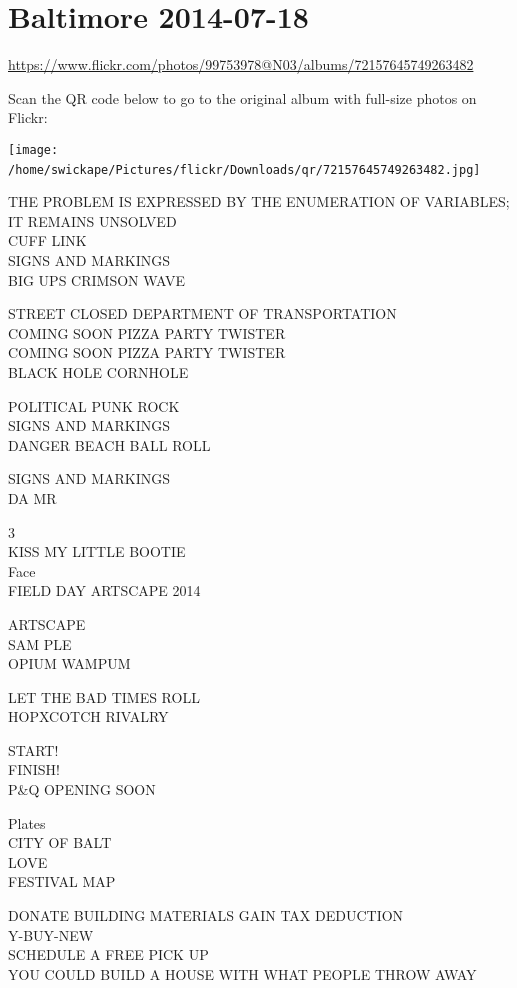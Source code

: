 \documentclass[10pt,letterpaper]{article}
\begin{document}
\section*{Baltimore 2014-07-18}

\url{https://www.flickr.com/photos/99753978@N03/albums/72157645749263482}

Scan the QR code below to go to the original album with full-size photos on Flickr:

\texttt{[image: /home/swickape/Pictures/flickr/Downloads/qr/72157645749263482.jpg]}
\

THE PROBLEM IS EXPRESSED BY THE ENUMERATION OF VARIABLES; IT REMAINS UNSOLVED\\
CUFF LINK\\
SIGNS AND MARKINGS\\
BIG UPS CRIMSON WAVE

STREET CLOSED DEPARTMENT OF TRANSPORTATION\\
COMING SOON PIZZA PARTY TWISTER\\
COMING SOON PIZZA PARTY TWISTER\\
BLACK HOLE CORNHOLE

POLITICAL PUNK ROCK\\
SIGNS AND MARKINGS\\
DANGER BEACH BALL ROLL

SIGNS AND MARKINGS\\
DA MR

3\\
KISS MY LITTLE BOOTIE\\
Face\\
FIELD DAY ARTSCAPE 2014

ARTSCAPE\\
SAM PLE\\
OPIUM WAMPUM

LET THE BAD TIMES ROLL\\
HOPXCOTCH RIVALRY

START!\\
FINISH!\\
P\&Q OPENING SOON

Plates\\
CITY OF BALT\\
LOVE\\
FESTIVAL MAP

DONATE BUILDING MATERIALS GAIN TAX DEDUCTION\\
Y{-}BUY{-}NEW\\
SCHEDULE A FREE PICK UP\\
YOU COULD BUILD A HOUSE WITH WHAT PEOPLE THROW AWAY
\end{document}
